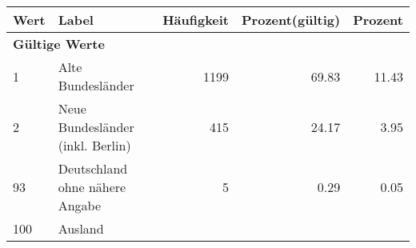      \begin{longtable}{lXrrr}
     \toprule
     \textbf{Wert} & \textbf{Label} & \textbf{Häufigkeit} & \textbf{Prozent(gültig)} & \textbf{Prozent} \\
     \endhead
     \midrule
     \multicolumn{5}{l}{\textbf{Gültige Werte}}\\

     1 &
     \multicolumn{1}{X}{ Alte Bundesländer   } &


       \num{1199} &
       \num[round-mode=places,round-precision=2]{69,83} &
         \num[round-mode=places,round-precision=2]{11,43} \\

     2 &
     \multicolumn{1}{X}{ Neue Bundesländer (inkl. Berlin)   } &


       \num{415} &
       \num[round-mode=places,round-precision=2]{24,17} &
         \num[round-mode=places,round-precision=2]{3,95} \\

     93 &
     \multicolumn{1}{X}{ Deutschland ohne nähere Angabe   } &


       \num{5} &
       \num[round-mode=places,round-precision=2]{0,29} &
         \num[round-mode=places,round-precision=2]{0,05} \\

     100 &
     \multicolumn{1}{X}{ Ausland   } &



\end{longtable}
